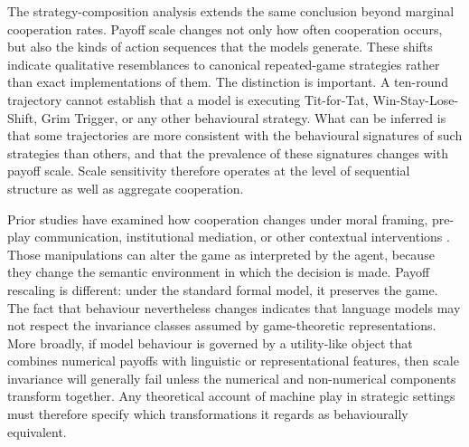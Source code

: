 \documentclass[11pt,a4paper]{article}
\begin{document}
The strategy-composition analysis extends the same conclusion beyond marginal cooperation rates. Payoff scale changes not only how often cooperation occurs, but also the kinds of action sequences that the models generate. These shifts indicate qualitative resemblances to canonical repeated-game strategies rather than exact implementations of them. The distinction is important. A ten-round trajectory cannot establish that a model is executing Tit-for-Tat, Win-Stay-Lose-Shift, Grim Trigger, or any other  behavioural strategy. What can be inferred is that some trajectories are more consistent with the behavioural signatures of such strategies than others, and that the prevalence of these signatures changes with payoff scale. Scale sensitivity therefore operates at the level of sequential structure as well as aggregate cooperation.


Prior studies have examined how cooperation changes under moral framing, pre-play communication, institutional mediation, or other contextual interventions \cite{buscemi2025strategic,lu2024llms,mao2025alympics,xie2026evolutionary}. Those manipulations can  alter the game as interpreted by the agent, because they change the semantic environment in which the decision is made. 
Payoff rescaling is different: under the standard formal model, it preserves the game. The fact that behaviour nevertheless changes indicates that language models may not respect the invariance classes assumed by game-theoretic representations. More broadly, if model behaviour is governed by a utility-like object that combines numerical payoffs with linguistic or representational features, then scale invariance will generally fail unless the numerical and non-numerical components transform together. Any theoretical account of machine play in strategic settings must therefore specify which transformations it regards as behaviourally equivalent.
\end{document}
